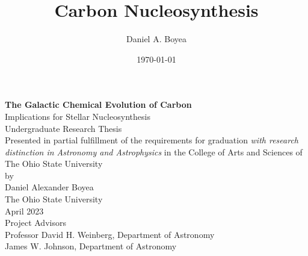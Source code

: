 \documentclass[12pt,oneside,letterpaper]{report}
\title{Carbon Nucleosynthesis}
\author{Daniel A. Boyea}
\date{\today}
\begin{document}

\begin{titlepage}
   \begin{center}
       \textbf{The Galactic Chemical Evolution of Carbon}\\
       Implications for Stellar Nucleosynthesis\\
       \vspace*{3\baselineskip}
        Undergraduate Research Thesis\\
       \vspace*{3\baselineskip}
    Presented in partial fulfillment of the requirements for graduation \textit{with research distinction in Astronomy and Astrophysics} in the College of Arts and Sciences of The Ohio State University\\
       \vspace*{3\baselineskip}
        by\\
       \vspace*{3\baselineskip}
       {Daniel Alexander Boyea}\\
       \vspace*{3\baselineskip}
       The Ohio State University\\
       April 2023\\
       \vspace*{3\baselineskip}
       Project Advisors\\
       Professor David H. Weinberg, Department of Astronomy \\
       James W. Johnson, Department of Astronomy
       \vfill
   \end{center}
\end{titlepage}



\end{document}
